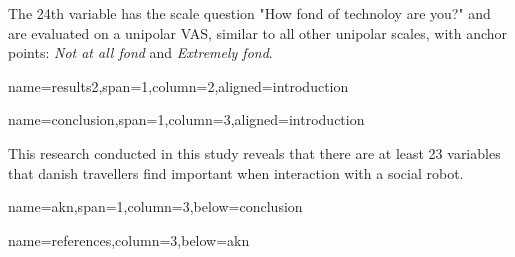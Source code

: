 \documentclass[paperwidth=160cm,paperheight=100cm,landscape,fontscale=0.3010]{baposter}
\begin{document}
\begin{poster}
{The 24th variable has the scale question "How fond of technoloy are you?" and are evaluated on a unipolar VAS, similar to all other unipolar scales, with anchor points: \textit{Not at all fond} and \textit{Extremely fond}.
}



{name=results2,span=1,column=2,aligned=introduction}
{\parskip 5pt


}


{name=conclusion,span=1,column=3,aligned=introduction}
{\parskip 5pt
This research conducted in this study reveals that there are at least 23 variables that danish travellers find important when interaction with a social robot. 


}


{name=akn,span=1,column=3,below=conclusion}
{\parskip 5pt

}


{name=references,column=3,below=akn}
{
\renewcommand{\section}[2]{}%
\footnotesize
}



\end{poster}
\end{document}
